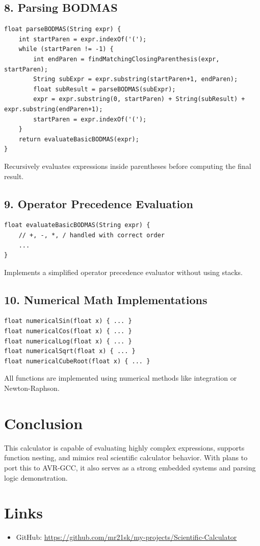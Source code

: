 \documentclass[12pt]{article}
\begin{document}
\subsection*{8. Parsing BODMAS}
\begin{lstlisting}
float parseBODMAS(String expr) {
    int startParen = expr.indexOf('(');
    while (startParen != -1) {
        int endParen = findMatchingClosingParenthesis(expr, startParen);
        String subExpr = expr.substring(startParen+1, endParen);
        float subResult = parseBODMAS(subExpr);
        expr = expr.substring(0, startParen) + String(subResult) + expr.substring(endParen+1);
        startParen = expr.indexOf('(');
    }
    return evaluateBasicBODMAS(expr);
}
\end{lstlisting}
Recursively evaluates expressions inside parentheses before computing the final result.

\subsection*{9. Operator Precedence Evaluation}
\begin{lstlisting}
float evaluateBasicBODMAS(String expr) {
    // +, -, *, / handled with correct order
    ...
}
\end{lstlisting}
Implements a simplified operator precedence evaluator without using stacks.

\subsection*{10. Numerical Math Implementations}
\begin{lstlisting}
float numericalSin(float x) { ... }
float numericalCos(float x) { ... }
float numericalLog(float x) { ... }
float numericalSqrt(float x) { ... }
float numericalCubeRoot(float x) { ... }
\end{lstlisting}
All functions are implemented using numerical methods like integration or Newton-Raphson.

\section*{Conclusion}
This calculator is capable of evaluating highly complex expressions, supports function nesting, and mimics real scientific calculator behavior. With plans to port this to AVR-GCC, it also serves as a strong embedded systems and parsing logic demonstration.

\section*{Links}
\begin{itemize}
    \item GitHub: \url{https://github.com/mr21sk/my-projects/Scientific-Calculator}
\end{itemize}
\end{document}
